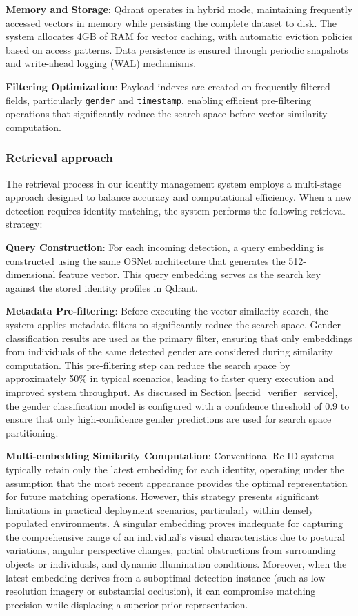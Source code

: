 \textbf{Memory and Storage}: Qdrant operates in hybrid mode, maintaining frequently accessed vectors in memory while persisting the complete dataset to disk. The system allocates 4GB of RAM for vector caching, with automatic eviction policies based on access patterns. Data persistence is ensured through periodic snapshots and write-ahead logging (WAL) mechanisms.

\textbf{Filtering Optimization}: Payload indexes are created on frequently filtered fields, particularly \texttt{gender} and \texttt{timestamp}, enabling efficient pre-filtering operations that significantly reduce the search space before vector similarity computation.

\subsubsection{Retrieval approach}

The retrieval process in our identity management system employs a multi-stage approach designed to balance accuracy and computational efficiency. When a new detection requires identity matching, the system performs the following retrieval strategy:

\textbf{Query Construction}: For each incoming detection, a query embedding is constructed using the same OSNet architecture that generates the 512-dimensional feature vector. This query embedding serves as the search key against the stored identity profiles in Qdrant.

\textbf{Metadata Pre-filtering}: Before executing the vector similarity search, the system applies metadata filters to significantly reduce the search space. Gender classification results are used as the primary filter, ensuring that only embeddings from individuals of the same detected gender are considered during similarity computation. This pre-filtering step can reduce the search space by approximately 50\% in typical scenarios, leading to faster query execution and improved system throughput. As discussed in Section \ref{sec:id_verifier_service}, the gender classification model is configured with a confidence threshold of 0.9 to ensure that only high-confidence gender predictions are used for search space partitioning.

\textbf{Multi-embedding Similarity Computation}: Conventional Re-ID systems typically retain only the latest embedding for each identity, operating under the assumption that the most recent appearance provides the optimal representation for future matching operations. However, this strategy presents significant limitations in practical deployment scenarios, particularly within densely populated environments. A singular embedding proves inadequate for capturing the comprehensive range of an individual's visual characteristics due to postural variations, angular perspective changes, partial obstructions from surrounding objects or individuals, and dynamic illumination conditions. Moreover, when the latest embedding derives from a suboptimal detection instance (such as low-resolution imagery or substantial occlusion), it can compromise matching precision while displacing a superior prior representation.

